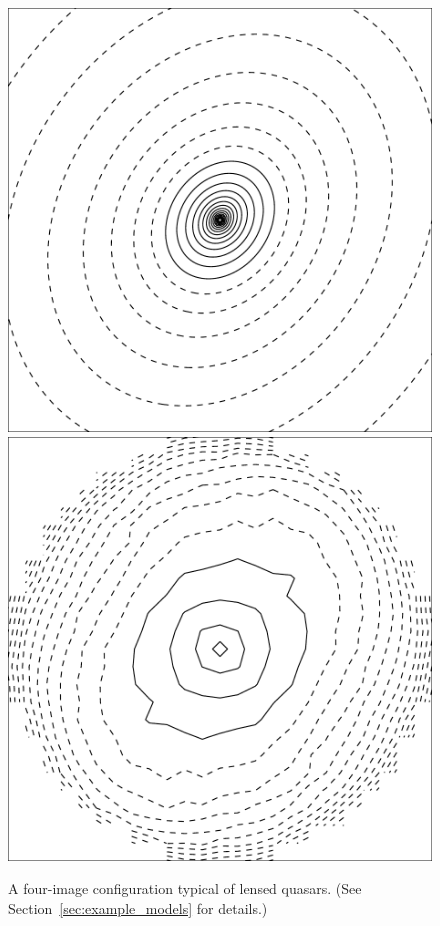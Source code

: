 \documentclass[usenatbib]{mn2e}
\newcommand{\secref}[1]{Section~\ref{sec:#1}}
\newlength{\myplotswidth}
\begin{document}
\begin{figure}
  \includegraphics[width=\myplotswidth]{fig/ASW0001hpf_006915_kappa}
  \includegraphics[width=\myplotswidth]{fig/006915_mass}

  \caption[result 6915 (ASW0001hpf)]{A four-image configuration
    typical of lensed quasars. (See \secref{example_models} for
    details.)}
  \label{fig:6915}
\end{figure}
\end{document}
